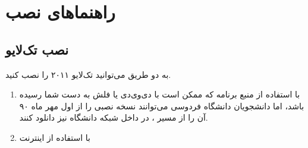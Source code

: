 \def\bs{$\backslash$}
\chapter{راهنماهای نصب}
\section{نصب تک‌لایو}
به دو طریق می‌توانید تک‌لایو ۲۰۱۱ را نصب کنید.
\begin{enumerate}
\item
با استفاده از منبع برنامه که ممکن است با دی‌وی‌دی یا فلش به دست شما رسیده باشد، اما دانشجویان دانشگاه فردوسی می‌توانند نسخه نصبی را از اول مهر ماه ۹۰ آن را از مسیر ، در داخل شبکه دانشگاه نیز دانلود کنند.
\item
با استفاده از اینترنت
\end{enumerate}
